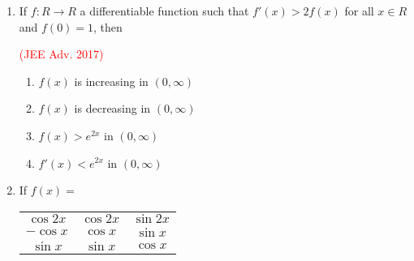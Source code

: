 \documentclass[journal,12pt,twocolumn]{IEEEtran}
\theoremstyle{remark}
\begin{document}
\begin{enumerate}[start = 7]
{\begin{flushleft}
\begin{enumerate}
            \end{enumerate}
        \end{flushleft}
        }
    \item{
        \begin{flushleft}
            If $f: R\rightarrow R$ a differentiable function such that $f'(x)>2f(x)$ for all $x \in R$ and $f(0) = 1$, then
            \begin{flushright}
                \textcolor{red}{(JEE Adv. 2017)}
            \end{flushright}
            \begin{enumerate}
                \item $f(x)$ is increasing in $(0,\infty)$
                \item $f(x)$ is decreasing in $(0,\infty)$
                \item $f(x)>e^{2x}$ in $(0,\infty)$
                \item $f'(x)<e^{2x}$ in $(0,\infty)$
            \end{enumerate}
        \end{flushleft}
        }
    \item{
        \begin{flushleft}
            If $f(x) = $
            \begin{tabular}{|c c c|} 
    
               $\cos 2x$& $\cos 2x$ & $\sin 2x$ \\ 
    
               $- \cos x$& $\cos x$ & $\sin x$\\ 
    
               $\sin x$ & $\sin x$ & $\cos x$\\ 
    

\end{tabular}
\end{flushleft}}
\end{enumerate}
\end{document}
